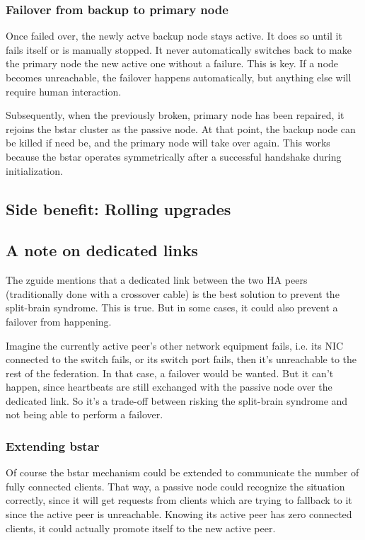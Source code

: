 \subsubsection{Failover from backup to primary node}
Once failed over, the newly actve backup node stays active. It does so until it
fails itself or is manually stopped. It never automatically switches back to
make the primary node the new active one without a failure. This is key. If a
node becomes unreachable, the failover happens automatically, but anything else will
require human interaction.

Subsequently, when the previously broken, primary node has been repaired, it
rejoins the \gls{bstar} cluster as the passive node. At that point, the backup
node can be killed if need be, and the primary node will take over again.  This
works because the \gls{bstar} operates symmetrically after a successful
handshake during initialization.

\subsection{Side benefit: Rolling upgrades}

\subsection{A note on dedicated links}
The \gls{zguide} mentions that a dedicated link between the two HA peers
(traditionally done with a crossover cable) is the best solution to prevent the
split-brain syndrome. This is true. But in some cases, it could also prevent a
failover from happening.

Imagine the currently active peer's other network equipment fails, i.e. its NIC
connected to the switch fails, or its switch port fails, then it's unreachable
to the rest of the federation. In that case, a failover would be wanted. But it
can't happen, since heartbeats are still exchanged with the passive node over
the dedicated link. So it's a trade-off between risking the split-brain
syndrome and not being able to perform a failover.

\subsubsection{Extending \gls{bstar}}
Of course the \gls{bstar} mechanism could be extended to
communicate the number of fully connected clients. That way, a passive node
could recognize the situation correctly, since it will get requests from
clients which are trying to fallback to it since the active peer is
unreachable. Knowing its active peer has zero connected clients, it could
actually promote itself to the new active peer.

